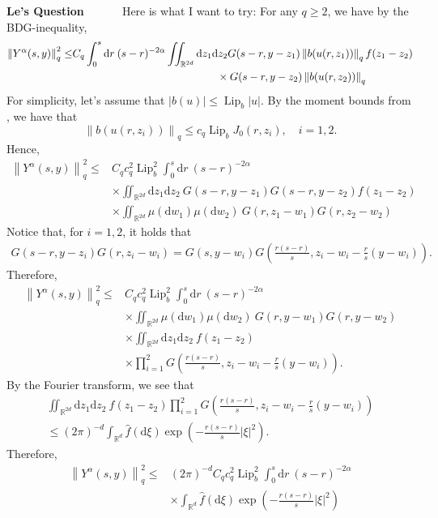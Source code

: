 \documentclass[a4paper,11pt]{article}
\theoremstyle{plain}
\theoremstyle{definition}
\newcommand{\ud}{\ensuremath{\mathrm{d}}}
\newcommand{\Norm}[1]{\left\|  #1   \right\|}
\newcommand{\R}{\mathbb{R}}
\DeclareMathOperator{\LIP}{Lip}
\newcounter{LQ}
\newenvironment{LeQuestion}[1][] %
  {\refstepcounter{LQ}
  \begin{mdframed}[backgroundcolor=red!10]\textbf{Le's Question \theLQ \: #1~~}~~~\noindent}%
  {\end{mdframed}}
\numberwithin{NQ}{section}
\numberwithin{LQ}{section}
\numberwithin{ZQ}{section}
\begin{document}
\begin{LeQuestion}
Here is what I want to try: 
For any $q\ge 2$, we have by the BDG-inequality, 
\begin{align*}
\Norm{Y^{\alpha}(s,y)}_q^2 \le & C_q \int_0^s \ud r \: (s-r)^{-2\alpha} \iint_{\R^{2d}} \ud z_1\ud z_2 G(s-r,y-z_1)  \Norm{b(u(r,z_1))}_q f(z_1-z_2)\\
&\hspace{13.5em} \times  G(s-r,y-z_2) \Norm{b(u(r,z_2))}_q 
\end{align*}
For simplicity, let's assume that $|b(u)|\le \LIP_b |u|$. By the moment bounds from \cite{CH16Comparison}, we have that 
\[
 \Norm{b(u(r,z_i))}_q \le c_q \LIP_b J_0(r,z_i),\quad i=1,2.
\]
Hence, 
\begin{align*}
\Norm{Y^{\alpha}(s,y)}_q^2 \le & C_q c_q^2\LIP_b^2 \int_0^s \ud r \: (s-r)^{-2\alpha} \\
&\times \iint_{\R^{2d}} \ud z_1\ud z_2\:  G(s-r,y-z_1) G(s-r,y-z_2)  f(z_1-z_2)\\
&\times \iint_{\R^{2d}}\mu(\ud  w_1) \mu(\ud w_2)\:  G(r,z_1-w_1)G(r,z_2-w_2) 
\end{align*}
Notice that, for $i=1,2$, it holds that 
\begin{align}
    G(s-r,y-z_i) G(r,z_i-w_i) = G(s, y-w_i) G\left(\frac{r(s-r)}{s}, z_i-w_i-\frac{r}{s}(y-w_i) \right).
\end{align}
Therefore, 
\begin{align*}
\Norm{Y^{\alpha}(s,y)}_q^2 \le & C_q c_q^2\LIP_b^2 \int_0^s \ud r \: (s-r)^{-2\alpha} \\
&\times \iint_{\R^{2d}}\mu(\ud  w_1) \mu(\ud w_2)\:  G(r,y-w_1)G(r,y-w_2) \\
&\times \iint_{\R^{2d}} \ud z_1\ud z_2\:  f(z_1-z_2) \\
&\times \prod_{i=1}^2 G\left(\frac{r(s-r)}{s}, z_i-w_i-\frac{r}{s}(y-w_i) \right).
\end{align*}
By the Fourier transform, we see that 
\begin{multline}
     \iint_{\R^{2d}} \ud z_1\ud z_2\:  f(z_1-z_2)  \prod_{i=1}^2 G\left(\frac{r(s-r)}{s}, z_i-w_i-\frac{r}{s}(y-w_i) \right) \\
\le   (2\pi)^{-d} \int_{\R^d} \hat{f}(\ud \xi) \exp\left(-\frac{r(s-r)}{s}|\xi|^2\right).
\end{multline}
Therefore, 
\begin{align*}
\Norm{Y^{\alpha}(s,y)}_q^2 \le & (2\pi)^{-d} C_q c_q^2\LIP_b^2 \int_0^s \ud r \: (s-r)^{-2\alpha} \\
&\times \int_{\R^{d}} \hat{f}(\ud \xi) \exp\left(-\frac{r(s-r)}{s}|\xi|^2\right)\\

\end{align*}
\end{LeQuestion}
\end{document}
